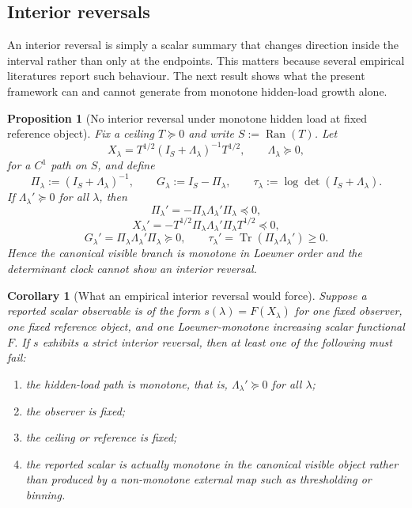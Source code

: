 \documentclass[11pt,a4paper]{article}
\numberwithin{equation}{section}
\DeclareMathOperator{\Tr}{Tr}
\DeclareMathOperator{\Ran}{Ran}
\theoremstyle{thmcompact}
\newtheorem{proposition}[theorem]{Proposition}
\newtheorem{corollary}[theorem]{Corollary}
\theoremstyle{remark}
\begin{document}
\subsection{Interior reversals}

An interior reversal is simply a scalar summary that changes direction inside the interval rather than only at the endpoints. This matters because several empirical literatures report such behaviour. The next result shows what the present framework can and cannot generate from monotone hidden-load growth alone.

\begin{proposition}[No interior reversal under monotone hidden load at fixed reference object]
\label{prop:no-fold}
Fix a ceiling \(T\succeq0\) and write \(S:=\Ran(T)\). Let
\[
X_\lambda=T^{1/2}(I_S+\Lambda_\lambda)^{-1}T^{1/2},
\qquad
\Lambda_\lambda\succeq0,
\]
for a \(C^1\) path on \(S\), and define
\[
\Pi_\lambda:=(I_S+\Lambda_\lambda)^{-1},
\qquad
G_\lambda:=I_S-\Pi_\lambda,
\qquad
\tau_\lambda:=\log\det(I_S+\Lambda_\lambda).
\]
If \(\Lambda_\lambda'\succeq0\) for all \(\lambda\), then
\[
\Pi_\lambda'=-\Pi_\lambda \Lambda_\lambda' \Pi_\lambda \preceq 0,
\]
\[
X_\lambda'=-T^{1/2}\Pi_\lambda \Lambda_\lambda' \Pi_\lambda T^{1/2}\preceq0,
\]
\[
G_\lambda'=\Pi_\lambda \Lambda_\lambda' \Pi_\lambda \succeq0,
\qquad
\tau_\lambda'=\Tr(\Pi_\lambda \Lambda_\lambda')\ge 0.
\]
Hence the canonical visible branch is monotone in Loewner order and the determinant clock cannot show an interior reversal.
\end{proposition}

\begin{corollary}[What an empirical interior reversal would force]
\label{cor:empirical-fold}
Suppose a reported scalar observable is of the form \(s(\lambda)=F(X_\lambda)\) for one fixed observer, one fixed reference object, and one Loewner-monotone increasing scalar functional \(F\). If \(s\) exhibits a strict interior reversal, then at least one of the following must fail:
\begin{enumerate}
\item the hidden-load path is monotone, that is, \(\Lambda_\lambda'\succeq0\) for all \(\lambda\);
\item the observer is fixed;
\item the ceiling or reference is fixed;
\item the reported scalar is actually monotone in the canonical visible object rather than produced by a non-monotone external map such as thresholding or binning.
\end{enumerate}
\end{corollary}
\end{document}
